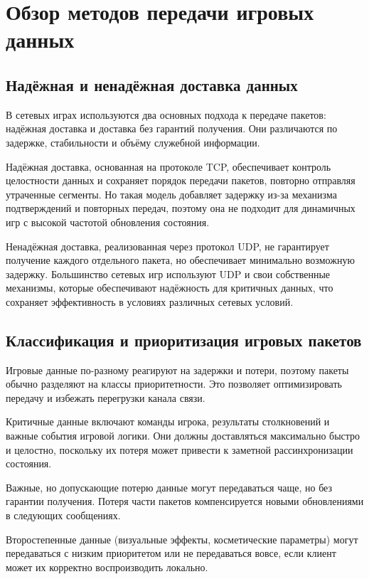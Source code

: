 \chapter{Обзор методов передачи игровых данных}

\section{Надёжная и ненадёжная доставка данных}

В сетевых играх используются два основных подхода к передаче пакетов: надёжная доставка\cite{kurose2013networking} и доставка
без гарантий получения. Они различаются по задержке, стабильности и объёму служебной информации.

Надёжная доставка, основанная на протоколе TCP\cite{stevens2011tcpip}, обеспечивает контроль целостности данных и сохраняет 
порядок передачи пакетов, повторно отправляя утраченные сегменты. Но такая модель добавляет задержку из-за механизма подтверждений и повторных
передач, поэтому она не подходит для динамичных игр с высокой частотой обновления состояния.

Ненадёжная доставка, реализованная через протокол UDP, не гарантирует получение каждого отдельного пакета, но
обеспечивает минимально возможную задержку. Большинство сетевых игр используют UDP и свои собственные
механизмы, которые обеспечивают надёжность для критичных данных, что сохраняет эффективность
в условиях различных сетевых условий.

\section{Классификация и приоритизация игровых пакетов}

Игровые данные по-разному реагируют на задержки и потери, поэтому пакеты обычно разделяют на классы
приоритетности. Это позволяет оптимизировать передачу и избежать перегрузки канала связи.

Критичные данные включают команды игрока, результаты столкновений и важные события игровой логики.
Они должны доставляться максимально быстро и целостно, поскольку их потеря
может привести к заметной рассинхронизации состояния.

Важные, но допускающие потерю данные могут передаваться чаще, но без гарантии получения. Потеря части пакетов компенсируется
новыми обновлениями в следующих сообщениях.

Второстепенные данные (визуальные эффекты, косметические параметры) могут передаваться с
низким приоритетом или не передаваться вовсе, если клиент может их корректно воспроизводить локально.

